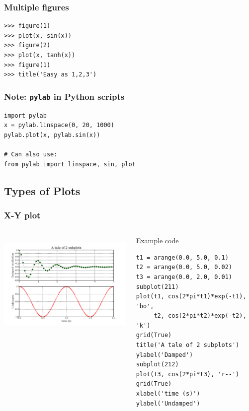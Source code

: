 \documentclass[14pt,compress]{beamer}
\newcounter{time}
\newcommand{\inctime}[1]{\addtocounter{time}{#1}{\tiny \thetime\ m}}
\newcommand{\typ}[1]{\lstinline{#1}}
\begin{document}
\begin{frame}[fragile]
    \frametitle{Multiple figures}

\begin{lstlisting}
>>> figure(1)
>>> plot(x, sin(x))
>>> figure(2)
>>> plot(x, tanh(x))
>>> figure(1)
>>> title('Easy as 1,2,3')
\end{lstlisting}
    

\end{frame}

\begin{frame}[fragile]
    \frametitle{Note: \typ{pylab} in Python scripts}
\begin{lstlisting}
import pylab
x = pylab.linspace(0, 20, 1000)
pylab.plot(x, pylab.sin(x))

# Can also use:
from pylab import linspace, sin, plot
\end{lstlisting}
\inctime{5}
\end{frame}

\subsection{Types of Plots}
\begin{frame}[fragile]
  \frametitle{X-Y plot}
  \begin{columns}
    \hspace*{-0.5in}
    \includegraphics[height=2in, interpolate=true]{data/xyplot}
    \begin{block}{Example code}
    \tiny
\begin{lstlisting}
t1 = arange(0.0, 5.0, 0.1)
t2 = arange(0.0, 5.0, 0.02)
t3 = arange(0.0, 2.0, 0.01)
subplot(211)
plot(t1, cos(2*pi*t1)*exp(-t1), 'bo', 
     t2, cos(2*pi*t2)*exp(-t2), 'k')
grid(True)
title('A tale of 2 subplots')
ylabel('Damped')
subplot(212)
plot(t3, cos(2*pi*t3), 'r--')
grid(True)
xlabel('time (s)')
ylabel('Undamped')
\end{lstlisting}
    \end{block}
  \end{columns}
\end{frame}
\end{document}
